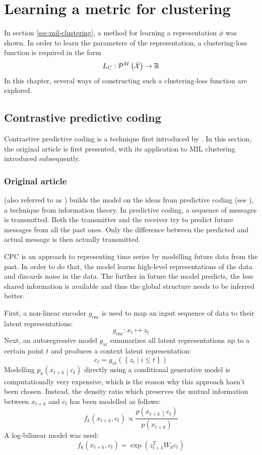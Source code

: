 \chapter{Learning a metric for clustering}\label{chap:clustering-metric}
In section \ref{sec:mil-clustering}, a method for learning a representation \( \phi \) was shown. In order to learn the parameters of the representation, a clustering-loss function is required in the form
\[ L_C : \mathcal{P}^M \left( \bar{\mathcal{X}} \right) \to \mathbb{R} \]
In this chapter, several ways of constructing such a clustering-loss function are explored.

\section{Contrastive predictive coding}
Contrastive predictive coding is a technique first introduced by \cite{oord_representation_2019}. In this section, the original article is first presented, with its application to MIL clustering introduced subsequently.

\subsection{Original article}
 (also referred to as ) builds the model on the ideas from predictive coding (see \cite{elias_predictive_1955}), a technique from information theory. In predictive coding, a sequence of messages is transmitted. Both the transmitter and the receiver try to predict future messages from all the past ones. Only the difference between the predicted and actual message is then actually transmitted.

CPC is an approach to representing time series by modelling future data from the past. In order to do that, the model learns high-level representations of the data and discards noise in the data. The further in future the model predicts, the less shared information is available and thus the global structure needs to be inferred better.

First, a non-linear encoder \( g_\mathrm{enc} \) is used to map an input sequence of data to their latent representations:
\[ g_\mathrm{enc} : x_t \mapsto z_t \]
Next, an autoregressive model \( g_\mathrm{ar} \) summarizes all latent representations up to a certain point \( t \) and produces a context latent representation:
\[ c_t = g_\mathrm{ar} \left( \left\{ z_i \middle| i \leq t \right\} \right) \]
Modelling \( p_k \left( x_{t + k} \middle| c_t \right) \) directly using a conditional generative model is computationally very expensive, which is the reason why this approach hasn't been chosen. Instead, the density ratio which preserves the mutual information between \( x_{t + k} \) and \( c_t \) has been modelled as follows:
\begin{equation}\label{equa:CPC-model}
  f_k \left( x_{t + k}, c_t \right) \propto \frac{p \left( x_{t + k} \middle| c_t \right)}{p \left( x_{t + k} \right)}
\end{equation}
A log-bilinear model was used:
\[ f_k \left( x_{t + k}, c_t \right) = \exp \left( z_{t + k}^T W_k c_t \right) \]

